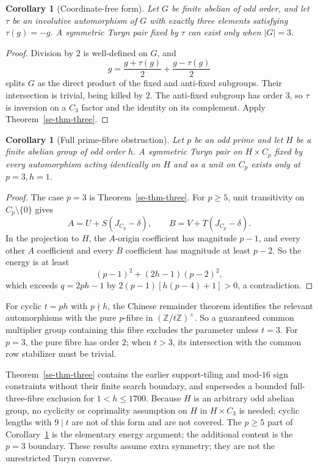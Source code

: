 \documentclass[11pt]{article}
\newtheorem{corollary}[theorem]{Corollary}
\theoremstyle{definition}
\theoremstyle{remark}
\begin{document}
\begin{corollary}[Coordinate-free form]
\label{se-cor-involution}
Let $G$ be finite abelian of odd order, and let $\tau$ be an involutive automorphism
of $G$ with exactly three elements satisfying $\tau(g)=-g$.
A symmetric Turyn pair fixed by $\tau$ can exist only when $|G|=3$.
\end{corollary}

\begin{proof}
Division by $2$ is well-defined on $G$, and
\[
 g=\frac{g+\tau(g)}2+\frac{g-\tau(g)}2
\]
splits $G$ as the direct product of the fixed and anti-fixed subgroups.
Their intersection is trivial, being killed by $2$.  The anti-fixed
subgroup has order $3$, so $\tau$ is inversion on a $C_3$ factor and
the identity on its complement.  Apply Theorem~\ref{se-thm-three}.
\end{proof}

\begin{corollary}[Full prime-fibre obstruction]
\label{se-cor-prime}
Let $p$ be an odd prime and let $H$ be a finite abelian group of odd order $h$.  A symmetric
Turyn pair on $H\times C_p$ fixed by every automorphism acting
identically on $H$ and as a unit on $C_p$ exists only at $p=3,h=1$.
\end{corollary}

\begin{proof}
The case $p=3$ is Theorem~\ref{se-thm-three}.  For $p\ge5$, unit
transitivity on $C_p\setminus\{0\}$ gives
\[
 A=U+S(J_{C_p}-\delta),\qquad
 B=V+T(J_{C_p}-\delta).
\]
In the projection to $H$, the $A$-origin coefficient has magnitude
$p-1$, and every other $A$ coefficient and every $B$ coefficient has
magnitude at least $p-2$.  So the energy is at least
\[
 (p-1)^2+(2h-1)(p-2)^2,
\]
which exceeds $q=2ph-1$ by $2(p-1)[h(p-4)+1]>0$, a contradiction.
\end{proof}

For cyclic $t=ph$ with $p\nmid h$, the Chinese remainder theorem
identifies the relevant automorphisms with the pure $p$-fibre in
$(\mathbb Z/t\mathbb Z)^\times$.  So a guaranteed common multiplier
group containing this fibre excludes the parameter unless $t=3$.
For $p=3$, the pure fibre has order $2$; when $t>3$, its intersection
with the common row stabilizer must be trivial.

Theorem~\ref{se-thm-three} contains the earlier support-tiling and
mod-$16$ sign constraints without their finite search boundary, and
supersedes a bounded full-three-fibre exclusion for $1<h\le1700$.
Because $H$ is an
arbitrary odd abelian group, no cyclicity or coprimality assumption on
$H$ in $H\times C_3$ is needed; cyclic lengths with $9\mid t$ are not of
this form and are not covered.  The $p\ge5$ part of
Corollary~\ref{se-cor-prime} is the elementary energy argument; the
additional content is the $p=3$ boundary.  These results assume extra
symmetry; they are not the unrestricted Turyn converse.
\end{document}

